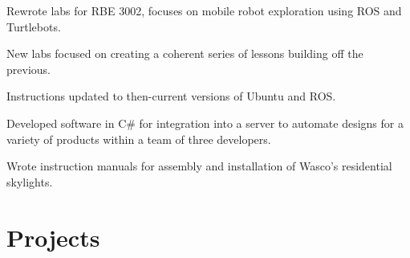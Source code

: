 \documentclass[letterpaper]{deedy-resume} %
\begin{document}
\begin{minipage}[t]{0.66\textwidth}
\sectionspace %



\begin{tightitemize}
\item Rewrote labs for RBE 3002, focuses on mobile robot exploration using ROS and Turtlebots.
\item New labs focused on creating a coherent series of lessons building off the previous.
\item Instructions updated to then-current versions of Ubuntu and ROS.
\end{tightitemize}

\sectionspace %



\begin{tightitemize}
\item Developed software in C\# for integration into a server to automate designs for a variety of products within a team of three developers.
\item Wrote instruction manuals for assembly and installation of Wasco's residential skylights.
\end{tightitemize}

\sectionspace %

\end{minipage} 




\newpage %

\section{Projects}

\end{document}
